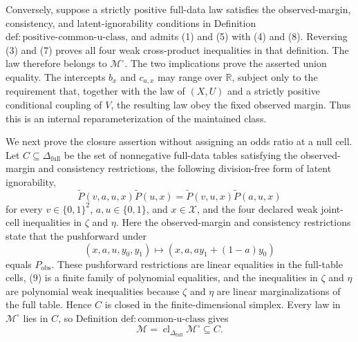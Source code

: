 Conversely, suppose a strictly positive full-data law satisfies the observed-margin, consistency, and latent-ignorability conditions in Definition \(\mathrm{def{:}positive\text{-}common\text{-}u\text{-}class}\), and admits (1) and (5) with (4) and (8).  Reversing (3) and (7) proves all four weak cross-product inequalities in that definition.  The law therefore belongs to \(\mathcal M^{\circ}\).  The two implications prove the asserted union equality.  The intercepts \(b_x\) and \(c_{a,x}\) may range over \(\mathbb R\), subject only to the requirement that, together with the law of \((X,U)\) and a strictly positive conditional coupling of \(V\), the resulting law obey the fixed observed margin.  Thus this is an internal reparameterization of the maintained class.

We next prove the closure assertion without assigning an odds ratio at a null cell.  Let \(C\subseteq\Delta_{\mathrm{full}}\) be the set of nonnegative full-data tables satisfying the observed-margin and consistency restrictions, the following division-free form of latent ignorability,
\[
\widetilde P(v,a,u,x)\widetilde P(u,x)
=\widetilde P(v,u,x)\widetilde P(a,u,x)                  \tag{9}
\]
for every \(v\in\{0,1\}^2\), \(a,u\in\{0,1\}\), and \(x\in\mathcal X\), and the four declared weak joint-cell inequalities in \(\zeta\) and \(\eta\).  Here the observed-margin and consistency restrictions state that the pushforward under
\[
(x,a,u,y_0,y_1)\longmapsto(x,a,ay_1+(1-a)y_0)
\]
equals \(P_{\mathrm{obs}}\).  These pushforward restrictions are linear equalities in the full-table cells, (9) is a finite family of polynomial equalities, and the inequalities in \(\zeta\) and \(\eta\) are polynomial weak inequalities because \(\zeta\) and \(\eta\) are linear marginalizations of the full table.  Hence \(C\) is closed in the finite-dimensional simplex.  Every law in \(\mathcal M^{\circ}\) lies in \(C\), so Definition \(\mathrm{def{:}common\text{-}u\text{-}class}\) gives
\[
\mathcal M
=\operatorname{cl}_{\Delta_{\mathrm{full}}}\mathcal M^{\circ}
\subseteq C.                                              \tag{10}
\]


